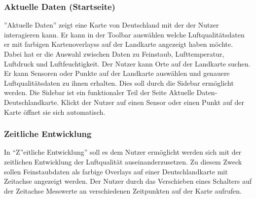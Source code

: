 \subsubsection{Aktuelle Daten (Startseite)}

''Aktuelle Daten'' zeigt eine Karte von Deutschland mit der der Nutzer interagieren kann. Er kann in der Toolbar auswählen welche Luftqualitätsdaten er mit farbigen \glspl{Kartenoverlays} auf der Landkarte angezeigt haben möchte. Dabei hat er die Auswahl zwischen Daten zu Feinstaub, Lufttemperatur, Luftdruck und Luftfeuchtigkeit.
Der Nutzer kann Orte auf der Landkarte suchen. Er kann Sensoren oder Punkte auf der Landkarte auswählen und genauere Luftqualitätsdaten zu ihnen erhalten. Dies soll durch die Sidebar ermöglicht werden.
Die Sidebar ist ein funktionaler Teil der Seite Aktuelle Daten-Deutschlandkarte. Klickt der Nutzer auf einen Sensor oder einen Punkt auf der Karte öffnet sie sich automatisch.


\subsubsection{Zeitliche Entwicklung}

In \enquote Zeitliche Entwicklung'' soll es dem Nutzer ermöglicht werden sich mit der zeitlichen Entwicklung der Luftqualität auseinanderzusetzen. Zu diesem Zweck sollen Feinstaubdaten als farbige Overlays auf einer Deutschlandkarte mit Zeitachse angezeigt werden. Der Nutzer durch das Verschieben eines Schalters auf der Zeitachse Messwerte an verschiedenen Zeitpunkten auf der Karte aufrufen.


